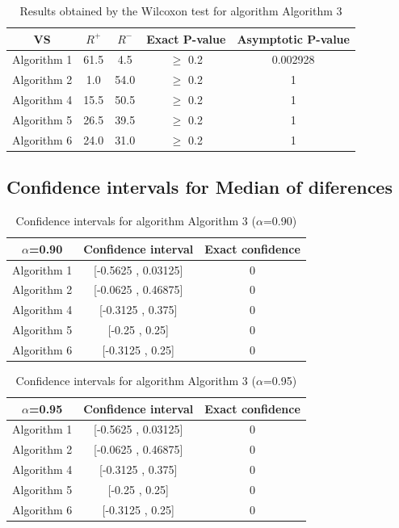 \documentclass[a4paper,10pt]{article}
\begin{document}
\begin{table}[!htp]
\centering\small
\begin{tabular}{
|c|c|c|c|c|}
\hline
 VS & $R^{+}$ & $R^{-}$ & Exact P-value & Asymptotic P-value \\ \hline 
Algorithm 1 & 61.5 & 4.5 & $\geq$ 0.2 & 0.002928\\ \hline 
Algorithm 2 & 1.0 & 54.0 & $\geq$ 0.2 & 1\\ \hline 
Algorithm 4 & 15.5 & 50.5 & $\geq$ 0.2 & 1\\ \hline 
Algorithm 5 & 26.5 & 39.5 & $\geq$ 0.2 & 1\\ \hline 
Algorithm 6 & 24.0 & 31.0 & $\geq$ 0.2 & 1\\ \hline 

\end{tabular}
\caption{Results obtained by the Wilcoxon test for algorithm Algorithm 3}
\end{table}

\subsection{Confidence intervals for Median of diferences}

\begin{table}[!htp]
\centering\small
\begin{tabular}{
|c|c|c|}
\hline
 $\alpha$=0.90 & Confidence interval & Exact confidence \\ \hline 
Algorithm 1 & [-0.5625 , 0.03125] & 0\\ \hline 
Algorithm 2 & [-0.0625 , 0.46875] & 0\\ \hline 
Algorithm 4 & [-0.3125 , 0.375] & 0\\ \hline 
Algorithm 5 & [-0.25 , 0.25] & 0\\ \hline 
Algorithm 6 & [-0.3125 , 0.25] & 0\\ \hline 

\end{tabular}
\caption{Confidence intervals for algorithm Algorithm 3 ($\alpha$=0.90)}
\end{table}
\begin{table}[!htp]
\centering\small
\begin{tabular}{
|c|c|c|}
\hline
 $\alpha$=0.95 & Confidence interval & Exact confidence \\ \hline 
Algorithm 1 & [-0.5625 , 0.03125] & 0\\ \hline 
Algorithm 2 & [-0.0625 , 0.46875] & 0\\ \hline 
Algorithm 4 & [-0.3125 , 0.375] & 0\\ \hline 
Algorithm 5 & [-0.25 , 0.25] & 0\\ \hline 
Algorithm 6 & [-0.3125 , 0.25] & 0\\ \hline 

\end{tabular}
\caption{Confidence intervals for algorithm Algorithm 3 ($\alpha$=0.95)}
\end{table}
\end{document}
